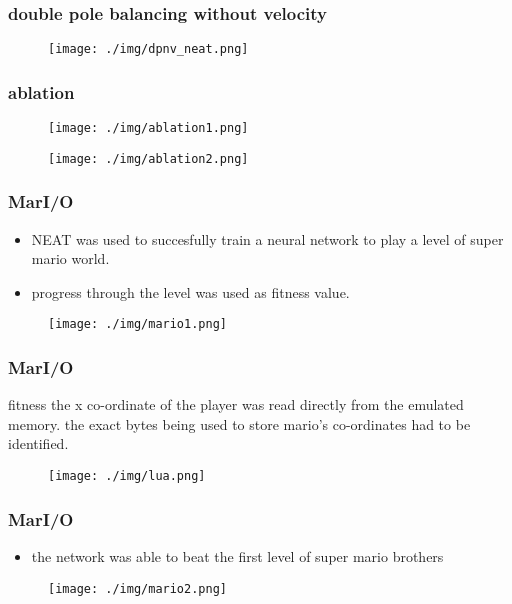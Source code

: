 \documentclass{beamer}
\begin{document}
\begin{frame}
\frametitle{double pole balancing without velocity}
\begin{figure}
\texttt{[image: ./img/dpnv\_neat.png]}
\end{figure}
\end{frame}

\begin{frame}
\frametitle{ablation}
\begin{figure}
\texttt{[image: ./img/ablation1.png]}
\end{figure}
\begin{figure}
\texttt{[image: ./img/ablation2.png]}
\end{figure}
\end{frame}


\begin{frame}
\scriptsize
\frametitle{MarI/O}
\begin{itemize}
\item NEAT was used to succesfully train a neural network to play a level of super mario world.
\item progress through the level was used as fitness value.
\end{itemize}
\begin{figure}
\texttt{[image: ./img/mario1.png]}
\end{figure}
\end{frame}

\begin{frame}
\scriptsize
\frametitle{MarI/O}
\begin{block}{fitness}
the x co-ordinate of the player was read directly from the emulated memory. the exact bytes being used to store mario's co-ordinates had to be identified.
\begin{figure}
\texttt{[image: ./img/lua.png]}
\end{figure}
\end{block}
\end{frame}

\begin{frame}
\scriptsize
\frametitle{MarI/O}
\begin{itemize}
\item the network was able to beat the first level of super mario brothers
\end{itemize}
\begin{figure}
\texttt{[image: ./img/mario2.png]}
\end{figure}
\end{frame}
\end{document}
